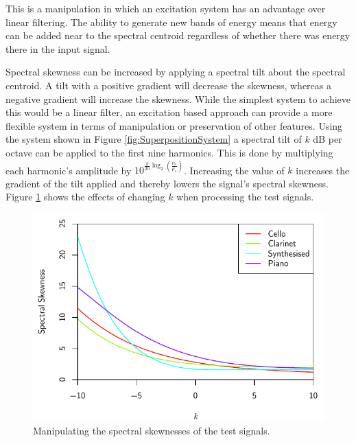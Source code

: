 			This is a manipulation in which an excitation system has an advantage over linear filtering. The
			ability to generate new bands of energy means that energy can be added near to the spectral
			centroid regardless of whether there was energy there in the input signal.

			Spectral skewness can be increased by applying a spectral tilt about the spectral centroid. A tilt
			with a positive gradient will decrease the skewness, whereas a negative gradient will increase the
			skewness. While the simplest system to achieve this would be a linear filter, an excitation based
			approach can provide a more flexible system in terms of manipulation or preservation of other
			features. Using the system shown in Figure \ref{fig:SuperpositionSystem} a spectral tilt of $k$ dB
			per octave can be applied to the first nine harmonics. This is done by multiplying each harmonic's
			amplitude by $10^{\frac{k}{20}\log_{2} \left( \frac{\nu_{n}}{\mu_{s}} \right)}$. Increasing the
			value of $k$ increases the gradient of the tilt applied and thereby lowers the signal's spectral
			skewness. Figure \ref{fig:MoveSkewnesses} shows the effects of changing $k$ when processing the
			test signals.

			\begin{figure}[h!]
				\centering
				\includegraphics{chapter6/Images/MoveSkewnesses.pdf}
				\caption{Manipulating the spectral skewnesses of the test signals.}
				\label{fig:MoveSkewnesses}
			\end{figure}

